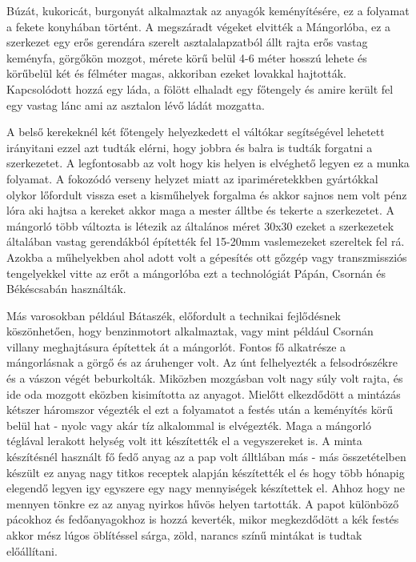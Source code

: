 \documentclass[fontsize=12pt, appendixprefix=true]{scrreprt}
\begin{document}
Búzát, kukoricát, burgonyát alkalmaztak az anyagók keményítésére, ez a folyamat a fekete konyhában történt. A megszáradt végeket elvitték a Mángorlóba, ez a szerkezet  egy erős gerendára szerelt asztalalapzatból állt rajta erős vastag keményfa, görgőkön mozgot, mérete körű belül 4-6 méter hosszú lehete és körűbelül két és félméter magas, akkoriban ezeket lovakkal hajtották. Kapcsolódott hozzá egy láda, a fölött elhaladt egy főtengely és amire került fel egy vastag lánc ami az asztalon lévő ládát mozgatta.


A belső kerekeknél két főtengely helyezkedett el váltókar segítségével lehetett irányitani ezzel azt tudták elérni, hogy jobbra és balra is tudták forgatni a szerkezetet. A legfontosabb az volt hogy kis helyen is elvéghető legyen ez a munka folyamat. A fokozódó verseny helyzet miatt az ipariméretekkben gyártókkal olykor lőfordult vissza eset a kisműhelyek forgalma és akkor sajnos nem volt pénz lóra aki hajtsa a kereket akkor maga a mester álltbe és tekerte a szerkezetet. A mángorló több változta is létezik az általános méret 30x30  ezeket a szerkezetek általában vastag gerendákból építették fel 15-20mm vaslemezeket szereltek fel rá.
Azokba a műhelyekben ahol adott volt a gépesítés ott gőzgép vagy transzmissziós tengelyekkel vitte az erőt a mángorlóba ezt a technológiát Pápán, Csornán és  Békéscsabán használták.

Más varosokban például Bátaszék, előfordult a technikai fejlődésnek köszönhetően, hogy benzinmotort alkalmaztak, vagy mint például Csornán villany meghajtásura építettek át a mángorlót. Fontos fő alkatrésze a mángorlásnak a görgő és az áruhenger volt. Az únt felhelyezték a felsodrószékre és a vászon végét beburkolták. Miközben mozgásban volt nagy súly volt rajta, és ide oda mozgott eközben kisimította az anyagot. Mielőtt elkezdődött a mintázás kétszer háromszor végezték el ezt a folyamatot a festés után a keményítés körű belül hat - nyolc  vagy akár tíz alkalommal is elvégezték. Maga a mángorló téglával lerakott helység volt itt készítették el a vegyszereket is. 
A minta készítésnél használt fő fedő anyag az a pap volt álltlában más - más összetételben készült ez anyag nagy titkos receptek alapján készítették el és hogy több hónapig elegendő legyen igy egyszere egy nagy mennyiségek készítettek el.  Ahhoz hogy ne mennyen tönkre ez az anyag nyirkos hűvös helyen tartották. A papot különböző  pácokhoz és fedőanyagokhoz is hozzá keverték, mikor megkezdődött a kék festés akkor mész lúgos öblítéssel sárga, zöld, narancs színű mintákat is tudtak előállítani.
\end{document}
